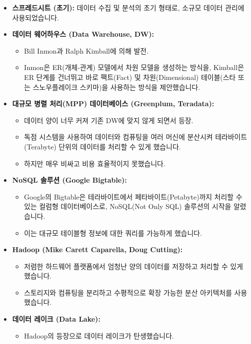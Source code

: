 \documentclass[11pt,a4paper]{article}
\begin{document}
\begin{itemize}
    \item \textbf{스프레드시트 (초기):} 데이터 수집 및 분석의 초기 형태로, 소규모 데이터 관리에 사용되었습니다.
    \item \textbf{데이터 웨어하우스 (Data Warehouse, DW):}
    \begin{itemize}
        \item Bill Inmon과 Ralph Kimball에 의해 발전.
        \item Inmon은 ER(개체-관계) 모델에서 차원 모델을 생성하는 방식을, Kimball은 ER 단계를 건너뛰고 바로 팩트(Fact) 및 차원(Dimensional) 테이블(스타 또는 스노우플레이크 스키마)을 사용하는 방식을 제안했습니다.
    \end{itemize}
    \item \textbf{대규모 병렬 처리(MPP) 데이터베이스 (Greenplum, Teradata):}
    \begin{itemize}
        \item 데이터 양이 너무 커져 기존 DW에 맞지 않게 되면서 등장.
        \item 독점 시스템을 사용하여 데이터와 컴퓨팅을 여러 머신에 분산시켜 테라바이트(Terabyte) 단위의 데이터를 처리할 수 있게 했습니다.
        \item 하지만 매우 비싸고 비용 효율적이지 못했습니다.
    \end{itemize}
    \item \textbf{NoSQL 솔루션 (Google Bigtable):}
    \begin{itemize}
        \item Google의 Bigtable은 테라바이트에서 페타바이트(Petabyte)까지 처리할 수 있는 컬럼형 데이터베이스로, NoSQL(Not Only SQL) 솔루션의 시작을 알렸습니다.
        \item 이는 대규모 테이블형 정보에 대한 쿼리를 가능하게 했습니다.
    \end{itemize}
    \item \textbf{Hadoop (Mike Carett Caparella, Doug Cutting):}
    \begin{itemize}
        \item 저렴한 하드웨어 플랫폼에서 엄청난 양의 데이터를 저장하고 처리할 수 있게 했습니다.
        \item 스토리지와 컴퓨팅을 분리하고 수평적으로 확장 가능한 분산 아키텍처를 사용했습니다.
    \end{itemize}
    \item \textbf{데이터 레이크 (Data Lake):}
    \begin{itemize}
        \item Hadoop의 등장으로 데이터 레이크가 탄생했습니다.

\end{itemize}
\end{itemize}
\end{document}
